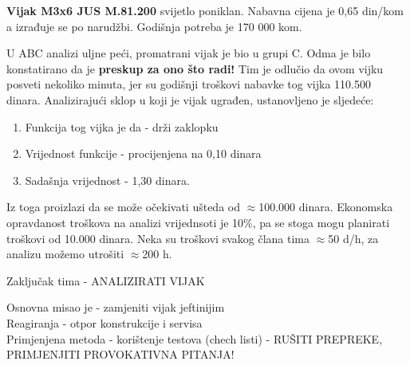 \documentclass[a4paper,12pt]{article}
\numberwithin{figure}{section}
\begin{document}
\textbf{Vijak M3x6 JUS M.81.200} svijetlo poniklan. Nabavna cijena je 0,65 din/kom a izrađuje se po narudžbi. Godišnja potreba je 170 000 kom.
\begin{figure}
  \vspace{-20pt}
  \begin{center}
    
  \end{center}
  \vspace{-20pt}
  \vspace{-10pt}
\end{figure}
U ABC analizi uljne peći, promatrani vijak je bio u grupi C. Odma je bilo konstatirano da je \textbf{preskup za ono što radi!} Tim je odlučio da ovom vijku posveti nekoliko minuta, jer su godišnji troškovi nabavke tog vijka 110.500 dinara. Analizirajući sklop u koji je vijak ugrađen, ustanovljeno je sljedeće:
\begin{enumerate}
\item Funkcija tog vijka je da - drži zaklopku
\item Vrijednost funkcije - procijenjena na 0,10 dinara
\item Sadašnja vrijednost - 1,30 dinara.
\end{enumerate} 
Iz toga proizlazi da se može očekivati ušteda od $\approx$100.000 dinara. Ekonomska opravdanost troškova na analizi vrijednsoti je 10\%, pa se stoga mogu planirati troškovi od 10.000 dinara. Neka su troškovi svakog člana tima $\approx$50 d/h, za analizu možemo utrošiti $\approx$200 h.
\begin{center}
Zaključak tima - ANALIZIRATI VIJAK
\end{center}
Osnovna misao je - zamjeniti vijak jeftinijim\\
Reagiranja - otpor konstrukcije i servisa\\
Primjenjena metoda - korištenje testova (chech listi) - RUŠITI PREPREKE, PRIMJENJITI PROVOKATIVNA PITANJA!
\end{document}
